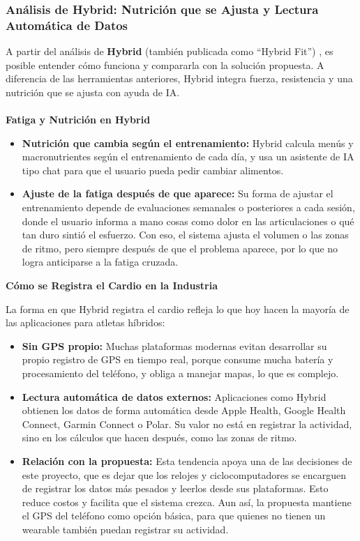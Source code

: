 \newpage
\subsubsection{Análisis de Hybrid: Nutrición que se Ajusta y Lectura Automática de Datos}
A partir del análisis de \textbf{Hybrid} (también publicada como ``Hybrid Fit'') \citep{hybrid_apple, hybrid_google}, es posible entender cómo funciona y compararla con la solución propuesta. A diferencia de las herramientas anteriores, Hybrid integra fuerza, resistencia y una nutrición que se ajusta con ayuda de IA.
\\\\
\textbf{Fatiga y Nutrición en Hybrid}

\begin{itemize}
    \item \textbf{Nutrición que cambia según el entrenamiento:} Hybrid calcula menús y macronutrientes según el entrenamiento de cada día, y usa un asistente de IA tipo chat para que el usuario pueda pedir cambiar alimentos.
    \item \textbf{Ajuste de la fatiga después de que aparece:} Su forma de ajustar el entrenamiento depende de evaluaciones semanales o posteriores a cada sesión, donde el usuario informa a mano cosas como dolor en las articulaciones o qué tan duro sintió el esfuerzo. Con eso, el sistema ajusta el volumen o las zonas de ritmo, pero siempre después de que el problema aparece, por lo que no logra anticiparse a la fatiga cruzada.
\end{itemize}
\textbf{Cómo se Registra el Cardio en la Industria}

La forma en que Hybrid registra el cardio refleja lo que hoy hacen la mayoría de las aplicaciones para atletas híbridos:
\begin{itemize}
    \item \textbf{Sin GPS propio:} Muchas plataformas modernas evitan desarrollar su propio registro de GPS en tiempo real, porque consume mucha batería y procesamiento del teléfono, y obliga a manejar mapas, lo que es complejo.
    \item \textbf{Lectura automática de datos externos:} Aplicaciones como Hybrid obtienen los datos de forma automática desde Apple Health, Google Health Connect, Garmin Connect o Polar. Su valor no está en registrar la actividad, sino en los cálculos que hacen después, como las zonas de ritmo.
    \item \textbf{Relación con la propuesta:} Esta tendencia apoya una de las decisiones de este proyecto, que es dejar que los relojes y ciclocomputadores se encarguen de registrar los datos más pesados y leerlos desde sus plataformas. Esto reduce costos y facilita que el sistema crezca. Aun así, la propuesta mantiene el GPS del teléfono como opción básica, para que quienes no tienen un wearable también puedan registrar su actividad.
\end{itemize}

